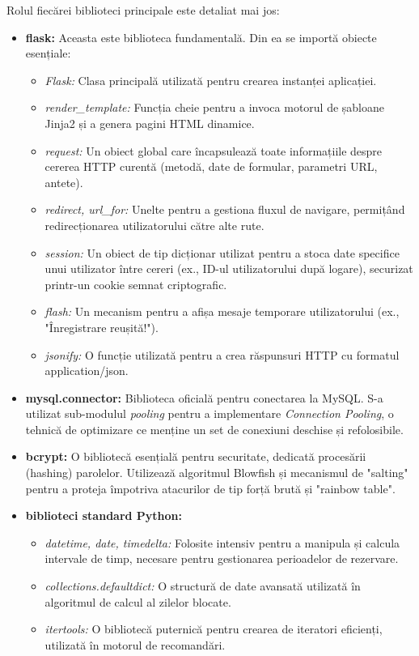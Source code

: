 \documentclass[12pt, a4paper, oneside, romanian]{teza-upb}
\begin{document}
Rolul fiecărei biblioteci principale este detaliat mai jos:
\begin{itemize}
	\item \textbf{flask:} Aceasta este biblioteca fundamentală. Din ea se importă obiecte esențiale:
	\begin{itemize}
		\item \textit{Flask:} Clasa principală utilizată pentru crearea instanței aplicației.
		\item \textit{render\_template:} Funcția cheie pentru a invoca motorul de șabloane Jinja2 și a genera pagini HTML dinamice.
		\item \textit{request:} Un obiect global care încapsulează toate informațiile despre cererea HTTP curentă (metodă, date de formular, parametri URL, antete).
		\item \textit{redirect, url\_for:} Unelte pentru a gestiona fluxul de navigare, permițând redirecționarea utilizatorului către alte rute.
		\item \textit{session:} Un obiect de tip dicționar utilizat pentru a stoca date specifice unui utilizator între cereri (ex., ID-ul utilizatorului după logare), securizat printr-un cookie semnat criptografic.
		\item \textit{flash:} Un mecanism pentru a afișa mesaje temporare utilizatorului (ex., "Înregistrare reușită!").
		\item \textit{jsonify:} O funcție utilizată pentru a crea răspunsuri HTTP cu formatul application/json.
	\end{itemize}
	
	\item \textbf{mysql.connector:} Biblioteca oficială pentru conectarea la MySQL. S-a utilizat sub-modulul \textit{pooling} pentru a implementare \textit{Connection Pooling}, o tehnică de optimizare ce menține un set de conexiuni deschise și refolosibile.
	
	\item \textbf{bcrypt:} O bibliotecă esențială pentru securitate, dedicată procesării (hashing) parolelor. Utilizează algoritmul Blowfish și mecanismul de "salting" pentru a proteja împotriva atacurilor de tip forță brută și "rainbow table".
	
	\item \textbf{biblioteci standard Python:}
	\begin{itemize}
		\item \textit{datetime, date, timedelta:} Folosite intensiv pentru a manipula și calcula intervale de timp, necesare pentru gestionarea perioadelor de rezervare.
		\item \textit{collections.defaultdict:} O structură de date avansată utilizată în algoritmul de calcul al zilelor blocate.
		\item \textit{itertools:} O bibliotecă puternică pentru crearea de iteratori eficienți, utilizată în motorul de recomandări.
	\end{itemize}
\end{itemize}
\end{document}
